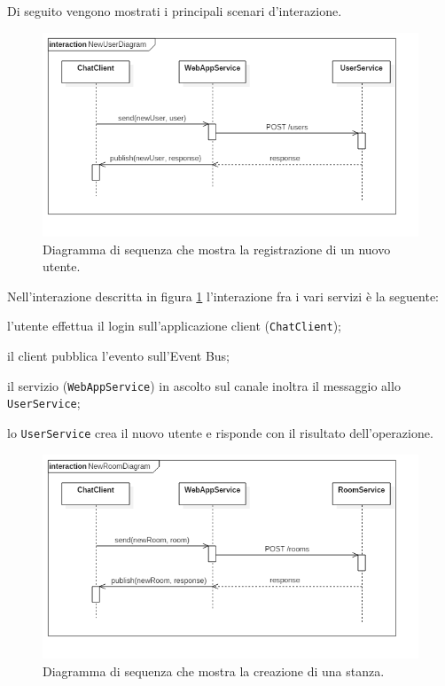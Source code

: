 \documentclass[a4paper]{article}
\begin{document}
Di seguito vengono mostrati i principali scenari d'interazione.

\begin{figure}[H]
    \centering
    \includegraphics[width=\linewidth, height=\textheight, keepaspectratio]{res/NewUserDiagram.png}
    \caption{Diagramma di sequenza che mostra la registrazione di un nuovo utente.}
    \label{fig:new-user-diagram}
\end{figure}

Nell'interazione descritta in figura \ref{fig:new-user-diagram} l'interazione fra i vari servizi è la seguente:
\begin{enumerate*}[label=(\arabic*)]
%
    \item l'utente effettua il login sull'applicazione client (\texttt{ChatClient});
%
    \item il client pubblica l'evento sull'Event Bus;
%
    \item il servizio (\texttt{WebAppService}) in ascolto sul canale inoltra il messaggio allo \texttt{UserService};
%
    \item lo \texttt{UserService} crea il nuovo utente e risponde con il risultato dell'operazione.
\end{enumerate*}

\begin{figure}[H]
    \centering
    \includegraphics[width=\linewidth, height=\textheight, keepaspectratio]{res/NewRoomDiagram.png}
        \caption{Diagramma di sequenza che mostra la creazione di una stanza.}
    \label{fig:new-room-diagram}
\end{figure}
\end{document}
